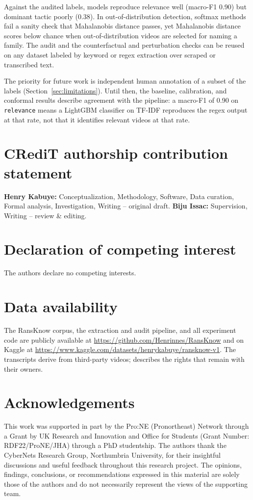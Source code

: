 \documentclass[preprint,12pt]{elsarticle}
\begin{document}
Against the audited labels, models reproduce relevance well (macro-F1
0.90) but dominant tactic poorly (0.38). In out-of-distribution detection,
softmax methods fail a sanity check that Mahalanobis distance passes, yet
Mahalanobis distance scores below chance when out-of-distribution videos
are selected for naming a family. The audit and the counterfactual and
perturbation checks can be reused on any dataset labeled by keyword or
regex extraction over scraped or transcribed text.

The priority for future work is independent human annotation of a subset
of the labels (Section~\ref{sec:limitations}). Until then, the baseline,
calibration, and conformal results describe agreement with the pipeline: a
macro-F1 of 0.90 on \texttt{relevance} means a LightGBM classifier on TF-IDF
reproduces the regex output at that rate, not that it identifies relevant
videos at that rate.

\section*{CRediT authorship contribution statement}
\textbf{Henry Kabuye:} Conceptualization, Methodology, Software, Data
curation, Formal analysis, Investigation, Writing -- original draft.
\textbf{Biju Issac:} Supervision, Writing -- review \& editing.

\section*{Declaration of competing interest}
The authors declare no competing interests.

\section*{Data availability}
\begingroup\raggedright
The RansKnow corpus, the extraction and audit pipeline, and all
experiment code are publicly available at
\url{https://github.com/Henrinnes/RansKnow} and on Kaggle at
\url{https://www.kaggle.com/datasets/henrykabuye/ransknow-v1}.
The transcripts derive from third-party videos; 
describes the rights that remain with their owners.
\par\endgroup

\section*{Acknowledgements}
This work was supported in part by the Pro:NE (Pronortheast) Network through a Grant by UK Research and Innovation and Office for Students (Grant Number: RDF22/ProNE/JHA) through a PhD studentship. The authors thank the
CyberNets Research Group, Northumbria University, for their insightful
discussions and useful feedback throughout this research project. The
opinions, findings, conclusions, or recommendations expressed in this
material are solely those of the authors and do not necessarily
represent the views of the supporting team.
\end{document}
